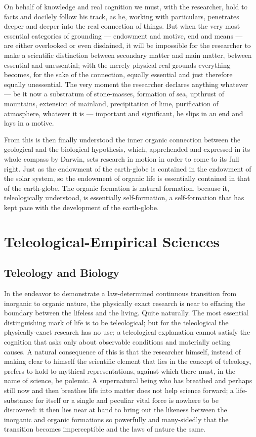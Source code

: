 \documentclass[12pt]{book}
\begin{document}
On behalf of knowledge and real cognition we must, with the researcher, hold to facts and
docilely follow his track, as he, working with particulars, penetrates deeper and deeper into
the real connection of things. But when the very most essential categories of grounding ---
endowment and motive, end and means --- are either overlooked or even disdained, it will be
impossible for the researcher to make a scientific distinction between secondary matter and
main matter, between essential and unessential; with the merely physical real-grounds
everything becomes, for the sake of the connection, equally essential and just therefore
equally unessential. The very moment the researcher declares anything whatever --- be it now a
substratum of stone-masses, formation of sea, upthrust of mountains, extension of mainland,
precipitation of lime, purification of atmosphere, whatever it is --- important and
significant, he slips in an end and lays in a motive.

From this is then finally understood the inner organic connection between the geological and
the biological hypothesis, which, apprehended and expressed in its whole compass by Darwin,
sets research in motion in order to come to its full right. Just as the endowment of the
earth-globe is contained in the endowment of the solar system, so the endowment of organic
life is essentially contained in that of the earth-globe. The organic formation is natural
formation, because it, teleologically understood, is essentially self-formation, a
self-formation that has kept pace with the development of the earth-globe.

\chapter{Teleological-Empirical Sciences}

\section{Teleology and Biology}
\label{sec:17}

\noindent In the endeavor to demonstrate a law-determined continuous transition from
inorganic to organic nature, the physically exact research is near to effacing the
boundary between the lifeless and the living. Quite naturally. The most essential
distinguishing mark of life is to be teleological; but for the teleological the
physically-exact research has no use; a teleological explanation cannot satisfy the
cognition that asks only about observable conditions and materially acting causes. A
natural consequence of this is that the researcher himself, instead of making clear to
himself the scientific element that lies in the concept of teleology, prefers to hold to
mythical representations, against which there must, in the name of science, be polemic. A
supernatural being who has breathed and perhaps still now and then breathes life into
matter does not help science forward; a life-substance for itself or a single and
peculiar vital force is nowhere to be discovered: it then lies near at hand to bring out
the likeness between the inorganic and organic formations so powerfully and many-sidedly
that the transition becomes imperceptible and the laws of nature the same.
\end{document}
